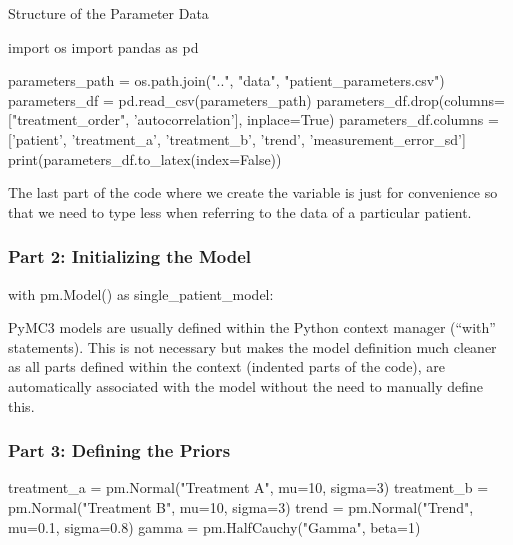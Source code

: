 \documentclass[12pt,a4paper,leqno]{report}
\theoremstyle{plain}
\theoremstyle{definition}
\theoremstyle{remark}
\begin{document}
\bigskip
\begin{table}[H]
\caption{Structure of the Parameter Data}\label{parameters}
\bigskip
\centering
\begin{pycode}
import os
import pandas as pd

parameters_path = os.path.join("..", "data", "patient_parameters.csv")
parameters_df = pd.read_csv(parameters_path)
parameters_df.drop(columns=["treatment_order", 'autocorrelation'], inplace=True)
parameters_df.columns = ['patient', 'treatment_a', 'treatment_b', 'trend', 'measurement_error_sd']
print(parameters_df.to_latex(index=False))
\end{pycode}
\end{table}
\smallskip

The last part of the code where we create the variable  is just for
convenience so that we need to type less when referring to the data of a particular patient.

\subsubsection*{Part 2: Initializing the Model}

\bigskip
\begin{pyverbatim}[][fontsize=\footnotesize]
with pm.Model() as single_patient_model:
\end{pyverbatim}
\smallskip

PyMC3 models are usually defined within the Python context manager (``with'' statements).
This is not necessary but makes the model definition much cleaner as all parts
defined within the context (indented parts of the code), are automatically associated
with the model without the need to manually define this.

\subsubsection*{Part 3: Defining the Priors}

\bigskip
\begin{pyverbatim}[][fontsize=\footnotesize]
    treatment_a = pm.Normal("Treatment A", mu=10, sigma=3)
    treatment_b = pm.Normal("Treatment B", mu=10, sigma=3)
    trend = pm.Normal("Trend", mu=0.1, sigma=0.8)
    gamma = pm.HalfCauchy("Gamma", beta=1)
\end{pyverbatim}
\smallskip
\end{document}
